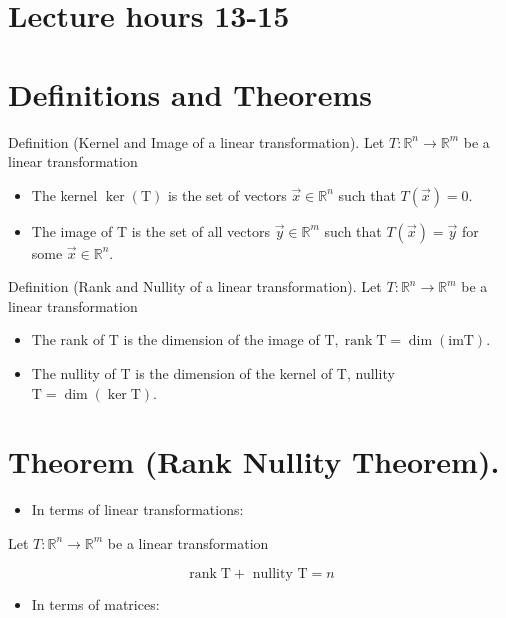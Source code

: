 \documentclass[10pt]{article}
\begin{document}
\section*{Lecture hours 13-15}
\section*{Definitions and Theorems}
Definition (Kernel and Image of a linear transformation). Let $T: \mathbb{R}^{n} \rightarrow \mathbb{R}^{m}$ be a linear transformation

\begin{itemize}
  \item The kernel $\operatorname{ker}(\mathrm{T})$ is the set of vectors $\vec{x} \in \mathbb{R}^{n}$ such that $T(\vec{x})=0$.
  \item The image of T is the set of all vectors $\vec{y} \in \mathbb{R}^{m}$ such that $T(\vec{x})=\vec{y}$ for some $\vec{x} \in \mathbb{R}^{n}$.
\end{itemize}

Definition (Rank and Nullity of a linear transformation). Let $T: \mathbb{R}^{n} \rightarrow \mathbb{R}^{m}$ be a linear transformation

\begin{itemize}
  \item The rank of T is the dimension of the image of $\mathrm{T}, \operatorname{rank} \mathrm{T}=\operatorname{dim}(\mathrm{im} \mathrm{T})$.
  \item The nullity of T is the dimension of the kernel of T, nullity $\mathrm{T}=\operatorname{dim}(\operatorname{ker} \mathrm{T})$.
\end{itemize}

\section*{Theorem (Rank Nullity Theorem).}
\begin{itemize}
  \item In terms of linear transformations:
\end{itemize}

Let $T: \mathbb{R}^{n} \rightarrow \mathbb{R}^{m}$ be a linear transformation

$$
\operatorname{rank} \mathrm{T}+\text { nullity } \mathrm{T}=n
$$

\begin{itemize}
  \item In terms of matrices:
\end{itemize}
\end{document}
